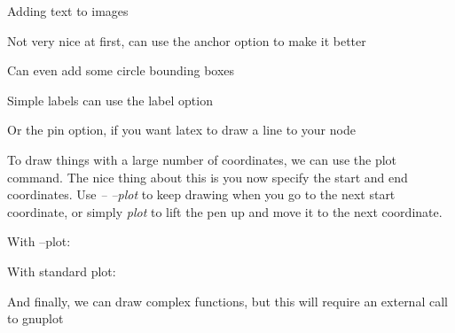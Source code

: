 \documentclass{article}
\begin{document}
Adding text to images


Not very nice at first, can use the anchor option to make it better


Can even add some circle bounding boxes


Simple labels can use the label option


Or the pin option, if you want latex to draw a line to your node


To draw things with a large number of coordinates, we can use the plot command.
The nice thing about this is you now specify the start and end coordinates. Use
\emph{-- --plot} to keep drawing when you go to the next start coordinate, or simply
\emph{plot} to lift the pen up and move it to the next coordinate.

With --plot:


With standard plot:


And finally, we can draw complex functions, but this will require an external
call to gnuplot
\end{document}
